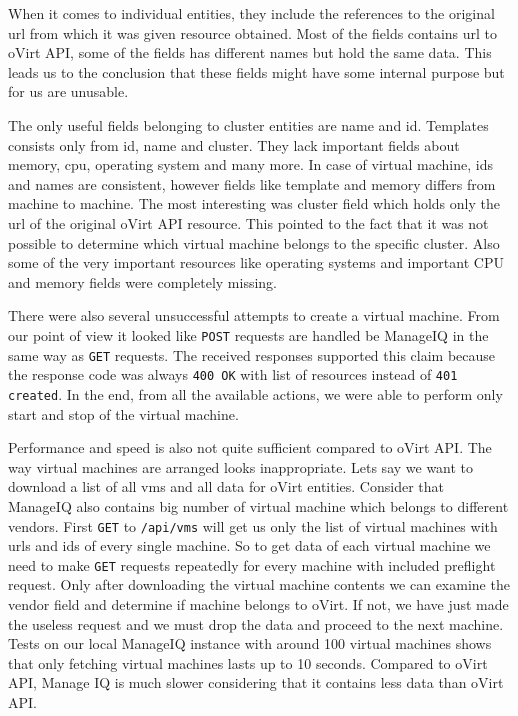 When it comes to individual entities, they include the references to the original url from which it was given resource obtained. Most of the fields contains url to oVirt API, some of the fields has different names but hold the same data. This leads us to the conclusion that these fields might have some internal purpose but for us are unusable. 

The only useful fields belonging to cluster entities are name and id. Templates consists only from id, name and cluster. They lack important fields about memory, cpu, operating system and many more. In case of virtual machine, ids and names are consistent, however fields like template and memory differs from machine to machine. The most interesting was cluster field which holds only the url of the original oVirt API resource. This pointed to the fact that it was not possible to determine which virtual machine belongs to the specific cluster. Also some of the very important resources like operating systems and important CPU and memory fields were completely missing.

There were also several unsuccessful attempts to create a virtual machine. From our point of view it looked like \texttt{POST} requests are handled be ManageIQ in the same way as \texttt{GET} requests. The received responses supported this	claim because the response code was always \texttt{400 OK} with list of resources instead of \texttt{401 created}. In the end, from all the available actions, we were able to perform only start and stop of the virtual machine.

Performance and speed is also not quite sufficient compared to oVirt API. The way virtual machines are arranged looks inappropriate. Lets say we want to download a list of all vms and all data for oVirt entities. Consider that ManageIQ also contains big number of virtual machine which belongs to different vendors. First \texttt{GET} to \texttt{/api/vms} will get us only the list of virtual machines with urls and ids of every single machine. So to get data of each virtual machine we need to make \texttt{GET} requests repeatedly for every machine with included preflight request. Only after downloading the virtual machine contents we can examine the vendor field and determine if machine belongs to oVirt. If not, we have just made the useless request and we must drop the data and proceed to the next machine. Tests on our local ManageIQ instance with around 100 virtual machines shows that only fetching virtual machines lasts up to 10 seconds. Compared to oVirt API, Manage IQ is much slower considering that it contains less data than oVirt API.  

